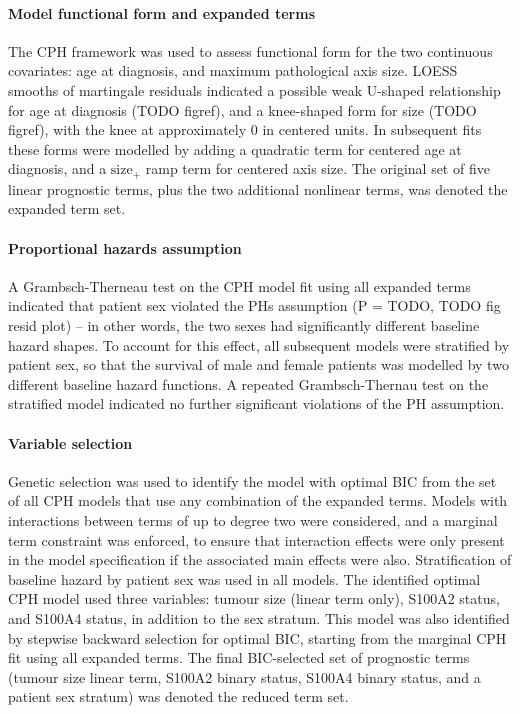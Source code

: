 \documentclass[dissertation.tex]{subfiles}
\begin{document}
\paragraph{Model functional form and expanded terms}
The \gls{CPH} framework was used to assess functional form for the two continuous covariates: age at diagnosis, and maximum pathological axis size.  \gls{LOESS} smooths of martingale residuals  indicated a possible weak U-shaped relationship for age at diagnosis (TODO figref), and a knee-shaped form for size (TODO figref), with the knee at approximately $0$ in centered units.  In subsequent fits these forms were modelled by adding a quadratic term for centered age at diagnosis, and a $\mbox{size}_+$ ramp term for centered axis size.  The original set of five linear prognostic terms, plus the two additional nonlinear terms, was denoted the expanded term set.

\paragraph{Proportional hazards assumption}
A Grambsch-Therneau test \cite{Grambsch1994} on the \gls{CPH} model fit using all expanded terms indicated that patient sex violated the \glspl{PH} assumption (P = TODO, TODO fig resid plot) -- in other words, the two sexes had significantly different baseline hazard shapes.  To account for this effect, all subsequent models were stratified by patient sex, so that the survival of male and female patients was modelled by two different baseline hazard functions.  A repeated Grambsch-Thernau test on the stratified model indicated no further significant violations of the \gls{PH} assumption.

\paragraph{Variable selection}
Genetic selection was used to identify the model with optimal \gls{BIC} from the set of all \gls{CPH} models that use any combination of the expanded terms.  Models with interactions between terms of up to degree two were considered, and a marginal term constraint was enforced, to ensure that interaction effects were only present in the model specification if the associated main effects were also.  Stratification of baseline hazard by patient sex was used in all models.  The identified optimal \gls{CPH} model used three variables: tumour size (linear term only), S100A2 status, and S100A4 status, in addition to the sex stratum.  This model was also identified by stepwise backward selection for optimal BIC, starting from the marginal \gls{CPH} fit using all expanded terms.  The final \gls{BIC}-selected set of prognostic terms (tumour size linear term, S100A2 binary status, S100A4 binary status, and a patient sex stratum) was denoted the reduced term set.
\end{document}
